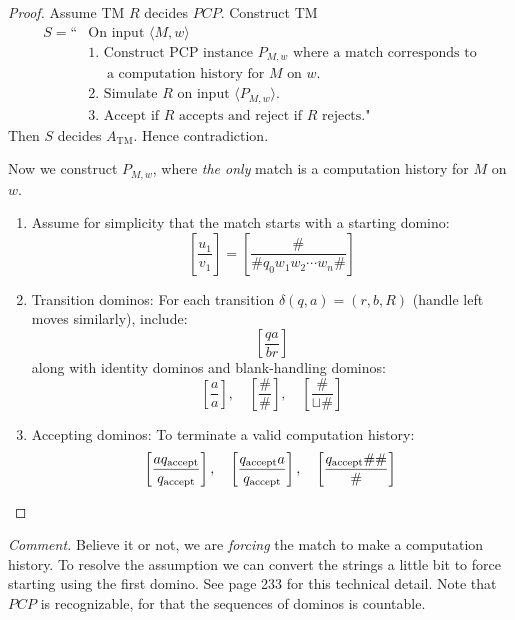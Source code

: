 \begin{proof}
  Assume TM $R$ decides $PCP$. Construct TM
  \begin{align*}
    S=\text{``} & \text{On input }\langle M,w\rangle                                           \\
                & \text{1. Construct PCP instance }P_{M,w}\text{ where a match corresponds to} \\
                & \quad\text{ a computation history for }M\text{ on }w.                        \\
                & \text{2. Simulate }R\text{ on input }\langle P_{M,w}\rangle.                 \\
                & \text{3. Accept if }R\text{ accepts and reject if }R\text{ rejects."}
  \end{align*}
  Then $S$ decides $A_{\mathrm{TM}}$. Hence contradiction.

  Now we construct $P_{M,w}$, where \textit{the only} match is a computation history for $M$ on $w$.
  \begin{enumerate}
    \item Assume for simplicity that the match starts with a starting domino:
          \[
            \left[ \frac{u_1}{v_1} \right] = \left[ \frac{\#}{\#q_0 w_1 w_2 \cdots w_n \#} \right]
          \]
    \item Transition dominos: For each transition \( \delta(q, a) = (r, b, R) \) (handle left moves similarly), include:
          \[
            \left[ \frac{q a}{b r} \right]
          \]
          along with identity dominos and blank-handling dominos:
          \[
            \left[ \frac{a}{a} \right], \quad \left[ \frac{\#}{\#} \right], \quad \left[ \frac{\#}{\sqcup\#} \right]
          \]
    \item Accepting dominos: To terminate a valid computation history:
          \[
            \left[ \frac{aq_{\text{accept}}}{q_{\text{accept}}} \right], \quad
            \left[ \frac{q_{\text{accept}} a}{q_{\text{accept}}} \right], \quad
            \left[ \frac{q_{\text{accept}} \# \#}{\#} \right]\qedhere
          \]
  \end{enumerate}
\end{proof}

\textit{Comment.} Believe it or not, we are \textit{forcing} the match to make a computation history. To resolve the assumption we can convert the strings a little bit to force starting using the first domino. See page 233 for this technical detail. Note that $PCP$ is recognizable, for that the sequences of dominos is countable.

